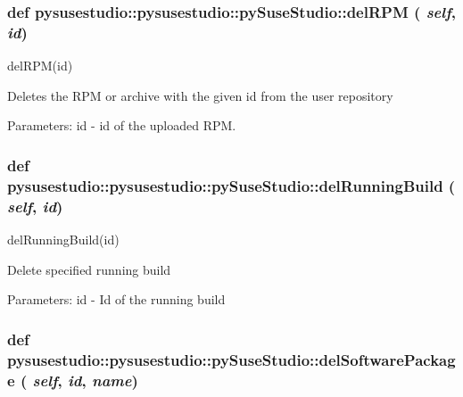  \hypertarget{classpysusestudio_1_1pysusestudio_1_1py_suse_studio_aca0d4536785c58675461f742aeb307bd}{
\subsubsection[{delRPM}]{\setlength{\rightskip}{0pt plus 5cm}def pysusestudio::pysusestudio::pySuseStudio::delRPM ( {\em self}, \/   {\em id})}}
\label{classpysusestudio_1_1pysusestudio_1_1py_suse_studio_aca0d4536785c58675461f742aeb307bd}
\begin{DoxyVerb}delRPM(id)

            Deletes the RPM or archive with the given id from the user repository
            
            Parameters:
id - id of the uploaded RPM.

\end{DoxyVerb}
 \hypertarget{classpysusestudio_1_1pysusestudio_1_1py_suse_studio_a52423d3a4317017b4a26ec66668e4ac4}{
\subsubsection[{delRunningBuild}]{\setlength{\rightskip}{0pt plus 5cm}def pysusestudio::pysusestudio::pySuseStudio::delRunningBuild ( {\em self}, \/   {\em id})}}
\label{classpysusestudio_1_1pysusestudio_1_1py_suse_studio_a52423d3a4317017b4a26ec66668e4ac4}
\begin{DoxyVerb}delRunningBuild(id)

            Delete specified running build
            
            Parameters:
id - Id of the running build

\end{DoxyVerb}
 \hypertarget{classpysusestudio_1_1pysusestudio_1_1py_suse_studio_a313bcab09e6ccdd4c038366949ca0010}{
\subsubsection[{delSoftwarePackage}]{\setlength{\rightskip}{0pt plus 5cm}def pysusestudio::pysusestudio::pySuseStudio::delSoftwarePackage ( {\em self}, \/   {\em id}, \/   {\em name})}}

